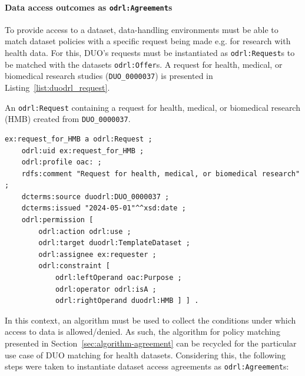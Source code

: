 \paragraph{Data access outcomes as \texttt{odrl:Agreement}s}
To provide access to a dataset, data-handling environments must be able to match dataset policies with a specific request being made e.g. for research with health data.
For this, DUO's requests must be instantiated as \texttt{odrl:Request}s to be matched with the datasets \texttt{odrl:Offer}s.
A request for health, medical, or biomedical research studies (\texttt{DUO\_0000037}) is presented in Listing~\ref{list:duodrl_request}.

\begin{listing}[htp]
\caption[\texttt{odrl:Request} containing DUO's HMB concept.]{An \texttt{odrl:Request} containing a request for health, medical, or biomedical research (HMB) created from \texttt{DUO\_0000037}.}
\label{list:duodrl_request}
\begin{verbatim}
ex:request_for_HMB a odrl:Request ;
    odrl:uid ex:request_for_HMB ;
    odrl:profile oac: ;
    rdfs:comment "Request for health, medical, or biomedical research" ;
    dcterms:source duodrl:DUO_0000037 ;
    dcterms:issued "2024-05-01"^^xsd:date ;
    odrl:permission [
        odrl:action odrl:use ;
        odrl:target duodrl:TemplateDataset ;
        odrl:assignee ex:requester ;
        odrl:constraint [
            odrl:leftOperand oac:Purpose ;
            odrl:operator odrl:isA ;
            odrl:rightOperand duodrl:HMB ] ] .
\end{verbatim}
\end{listing}

In this context, an algorithm must be used to collect the conditions under which access to data is allowed/denied.
As such, the algorithm for policy matching presented in Section~\ref{sec:algorithm-agreement} can be recycled for the particular use case of DUO matching for health datasets.
Considering this, the following steps were taken to instantiate dataset access agreements as \texttt{odrl:Agreement}s:


